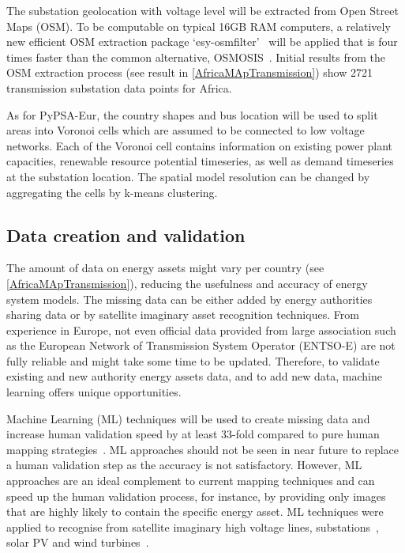 \documentclass[conference, a4paper]{IEEEtran}
\begin{document}
The substation geolocation with voltage level will be extracted from Open Street Maps (OSM). To be computable on typical 16GB RAM computers, a relatively new efficient OSM extraction package `esy-osmfilter'~\cite{pluta-lunsdorf-2020} will be applied that is four times faster than the common alternative, OSMOSIS~\cite{henderson-2020}. Initial results from the OSM extraction process (see result in \cref{AfricaMApTransmission}) show 2721 transmission substation data points for Africa.

As for PyPSA-Eur, the country shapes and bus location will be used to split areas into Voronoi cells which are assumed to be connected to low voltage networks. Each of the Voronoi cell contains information on existing power plant capacities, renewable resource potential timeseries, as well as demand timeseries at the substation location. The spatial model resolution can be changed by aggregating the cells by k-means clustering.

\subsection{Data creation and validation}

The amount of data on energy assets might vary per country (see \cref{AfricaMApTransmission}), reducing the usefulness and accuracy of energy system models. The missing data can be either added by energy authorities sharing data or by satellite imaginary asset recognition techniques. From experience in Europe, not even official data provided from large association such as the European Network of Transmission System Operator (ENTSO-E) are not fully reliable and might take some time to be updated\cite{gotzens-heinrichs-ea-2019,PyPSAEur}. Therefore, to validate existing and new authority energy assets data, and to add new data, machine learning offers unique opportunities. 

Machine Learning (ML) techniques will be used to create missing data and increase human validation speed by at least 33-fold compared to pure human mapping strategies~\cite{developmentseed-2018}. ML approaches should not be seen in near future to replace a human validation step as the accuracy is not satisfactory. However, ML approaches are an ideal complement to current mapping techniques and can speed up the human validation process, for instance, by providing only images that are highly likely to contain the specific energy asset. ML techniques were applied to recognise from satellite imaginary high voltage lines, substations~\cite{developmentseed-2018}, solar PV \cite{dehoog-maetschke-ea-2020} and wind turbines~\cite{zhou-irvin-ea-2019}.
\end{document}
